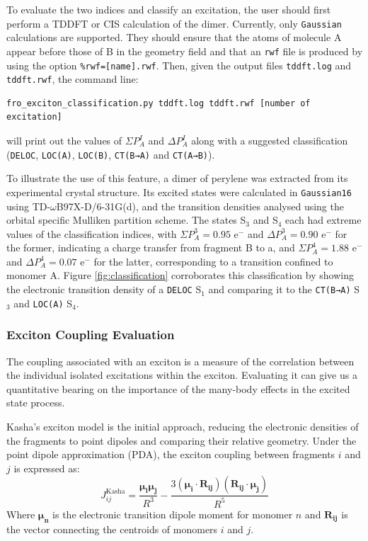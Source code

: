 To evaluate the two indices and classify an excitation, the user should first perform a TDDFT or CIS calculation of the dimer. Currently, only \texttt{Gaussian} calculations are supported. They should ensure that the atoms of molecule A appear before those of B in the geometry field and that an \texttt{rwf} file is produced by using the option \texttt{\%rwf=[name].rwf}. Then, given the output files \texttt{tddft.log} and \texttt{tddft.rwf}, the command line:
\begin{verbatim}
fro_exciton_classification.py tddft.log tddft.rwf [number of excitation]
\end{verbatim}
will print out the values of $\Sigma P^I_A$ and $\Delta P^I_A$ along with a suggested classification (\texttt{DELOC}, \texttt{LOC(A)}, \texttt{LOC(B)}, \texttt{CT(B→A)} and \texttt{CT(A→B)}).

To illustrate the use of this feature, a dimer of perylene was extracted from its experimental crystal structure.\cite{Botoshansky2003} Its excited states were calculated in \texttt{Gaussian16} using TD-$\omega$B97X-D\slash{}6-31G(d), and the transition densities analysed using the orbital specific Mulliken partition scheme. The states S$_3$ and S$_4$ each had extreme values of the classification indices, with $\Sigma P^3_A = 0.95$ $\mathrm{e^-}$ and $\Delta P^3_A = 0.90$ $\mathrm{e^-}$ for the former, indicating a charge transfer from fragment B to a, and $\Sigma P^4_A = 1.88$ $\mathrm{e^-}$ and $\Delta P^4_A = 0.07$ $\mathrm{e^-}$ for the latter, corresponding to a transition confined to monomer A. Figure \ref{fig:classification} corroborates this classification by showing the electronic transition density of a \texttt{DELOC} S$_1$ and comparing it to the \texttt{CT(B→A)} S$_3$ and \texttt{LOC(A)} S$_4$.




\subsubsection{Exciton Coupling Evaluation}
\label{sec:detail_js}
The coupling associated with an exciton is a measure of the correlation between the individual isolated excitations within the exciton. Evaluating it can give us a quantitative bearing on the importance of the many-body effects in the excited state process.

Kasha's exciton model is the initial approach, reducing the electronic densities of the fragments to point dipoles and comparing their relative geometry.\cite{Kasha1965} Under the point dipole approximation (PDA), the exciton coupling between fragments $i$ and $j$ is expressed as:
\begin{equation}
J_{ij}^{\text{Kasha}} = \frac{\bm{\mu_i} \bm{\mu_j}}{R^3} - \frac{3(\bm{\mu_i}\cdot{}\bm{R_{ij}})(\bm{R_{ij}} \cdot{} \bm{\mu_j}) }{R^5}
\label{eq:pda}
\end{equation}
Where $\bm{\mu_n}$ is the electronic transition dipole moment for monomer $n$ and $\bm{R_{ij}}$ is the vector connecting the centroids of monomers $i$ and $j$.

